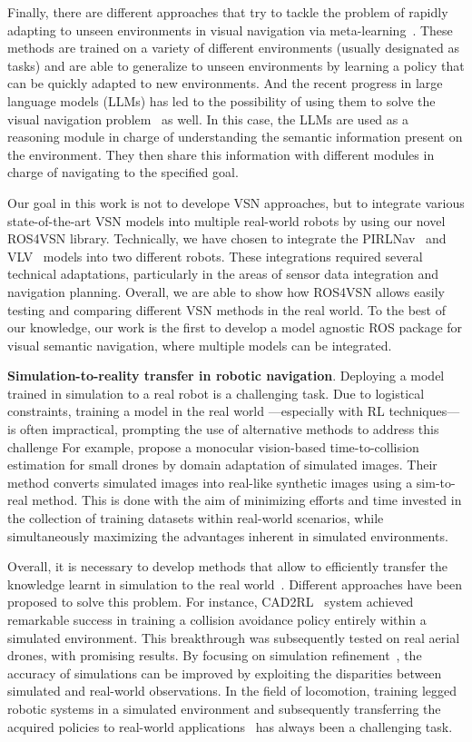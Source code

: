 Finally, there are different approaches that try to tackle the problem of rapidly adapting to unseen environments in visual navigation via meta-learning~\cite{wortsman2019, luo2021, zhang2022}.
These methods are trained on a variety of different environments (usually designated as tasks) and are able to generalize to unseen environments by learning a policy that can be quickly adapted to new environments.
And the recent progress in large language models (LLMs) has led to the possibility of using them to solve the visual navigation problem~\cite{Huang2023, Zhou2023} as well.
In this case, the LLMs are used as a reasoning module in charge of understanding the semantic information present on the environment.
They then share this information with different modules in charge of navigating to the specified goal.

Our goal in this work is not to develope VSN approaches, but to integrate various state-of-the-art VSN models into multiple real-world robots by using our novel ROS4VSN library.
Technically, we have chosen to integrate the PIRLNav~\cite{ramrakhya2023} and VLV~\cite{chang2020} models into two different robots.
These integrations required several technical adaptations, particularly in the areas of sensor data integration and navigation planning.
Overall, we are able to show how ROS4VSN allows easily testing and comparing different VSN methods in the real world.
To the best of our knowledge, our work is the first to develop a model agnostic ROS package for visual semantic navigation, where multiple models can be integrated.

\textbf{Simulation-to-reality transfer in robotic navigation}.
Deploying a model trained in simulation to a real robot is a challenging task.
Due to logistical constraints, training a model in the real world —especially with RL techniques— is often impractical, prompting the use of alternative methods to address this challenge
For example, \cite{kim2022} propose a monocular vision-based time-to-collision estimation for small drones by domain adaptation of simulated images.
Their method converts simulated images into real-like synthetic images using a sim-to-real method.
This is done with the aim of minimizing efforts and time invested in the collection of training datasets within real-world scenarios, while simultaneously maximizing the advantages inherent in simulated environments.

Overall, it is necessary to develop methods that allow to efficiently transfer the knowledge learnt in simulation to the real world~\cite{kadian2020}.
Different approaches have been proposed to solve this problem.
For instance, CAD2RL~\cite{sadeghiCAD2RLRealSingleImage2017} system achieved remarkable success in training a collision avoidance policy entirely within a simulated environment.
This breakthrough was subsequently tested on real aerial drones, with promising results.
By focusing on simulation refinement~\cite{Son2020}, the accuracy of simulations can be improved by exploiting the disparities between simulated and real-world observations.
In the field of locomotion, training legged robotic systems in a simulated environment and subsequently transferring the acquired policies to real-world applications~\cite{Hwangbo_2019, agarwal2022} has always been a challenging task.

